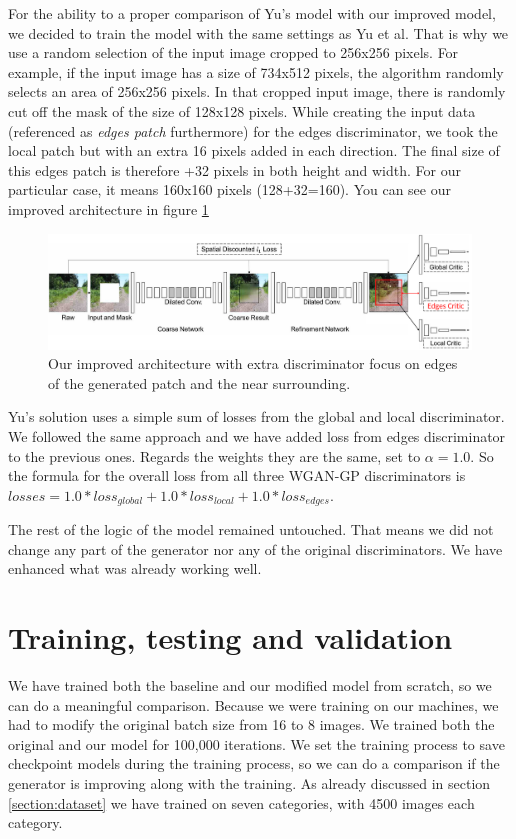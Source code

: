 \documentclass[a4paper, 11pt]{article}
\begin{document}
For the ability to a proper comparison of Yu's model with our improved model, we decided to train the model with the same settings as Yu et al. That is why we use a random selection of the input image cropped to 256x256 pixels. For example, if the input image has a size of 734x512 pixels, the algorithm randomly selects an area of 256x256 pixels. In that cropped input image, there is randomly cut off the mask of the size of 128x128 pixels.
While creating the input data (referenced as \textit{edges patch} furthermore) for the edges discriminator, we took the local patch but with an extra 16 pixels added in each direction. The final size of this edges patch is therefore +32 pixels in both height and width. For our particular case, it means 160x160 pixels (128+32=160).
You can see our improved architecture in figure \ref{img:ourArch}
\begin{figure}
    \centering
    \includegraphics[width=0.95\linewidth]{documentation/img/new_arch.png}
    \caption{Our improved architecture with extra discriminator focus on edges of the generated patch and the near surrounding.}
    \label{img:ourArch}
\end{figure}

Yu's solution uses a simple sum of losses from the global and local discriminator. We followed the same approach and we have added loss from edges discriminator to the previous ones. Regards the weights they are the same, set to $\alpha = 1.0$. So the formula for the overall loss from all three WGAN-GP discriminators is $losses=1.0*loss_{global} + 1.0*loss_{local} + 1.0*loss_{edges}$.

The rest of the logic of the model remained untouched. That means we did not change any part of the generator nor any of the original discriminators. We have enhanced what was already working well.

\section{Training, testing and validation}
\label{section:training}
We have trained both the baseline and our modified model from scratch, so we can do a meaningful comparison.
Because we were training on our machines, we had to modify the original batch size from 16 to 8 images.
We trained both the original and our model for 100,000 iterations. We set the training process to save checkpoint models during the training process, so we can do a comparison if the generator is improving along with the training.
As already discussed in section \ref{section:dataset} we have trained on seven categories, with 4500 images each category.
\end{document}
